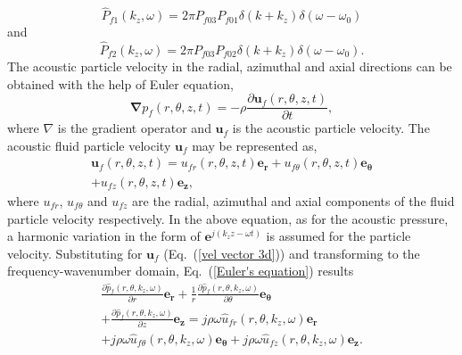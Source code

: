 \documentclass[twocolumn,10pt]{asme2ej}
\begin{document}
\begin{equation}
    \hat{P}_{f1}(k_z,\omega) = 2\pi P_{f03}P_{f01}\delta(k+k_z)\delta(\omega-\omega_0)
\end{equation}
and
\begin{equation}
    \hat{P}_{f2}(k_z,\omega) = 2\pi P_{f03}P_{f02}\delta(k+k_z)\delta(\omega-\omega_0).
\end{equation}
The acoustic particle velocity in the radial, azimuthal and axial directions can be obtained with the help of Euler equation,
\begin{equation}\label{Euler's equation}
    \pmb{\nabla} p_{f}(r,\theta,z,t) = -\rho \frac{\partial \mathbf{u}_f(r,\theta,z,t)}{\partial t},
\end{equation}
where $\nabla$ is the gradient operator and $\mathbf{u}_f$ is the acoustic particle velocity. The acoustic fluid particle velocity $\mathbf{u}_f$ may be represented as,
\begin{multline}\label{vel vector 3d}
    \mathbf{u}_f(r,\theta,z,t) = u_{fr}(r,\theta,z,t)\mathbf{e_r} + u_{f\theta}(r,\theta,z,t)\mathbf{e}_{\pmb{\theta}}\\ + u_{fz}(r,\theta,z,t)\mathbf{e_z},
\end{multline}
where $u_{fr}$, $u_{f\theta}$ and $u_{fz}$ are the radial, azimuthal and axial components of the fluid particle velocity respectively. In the above equation, as for the acoustic pressure, a harmonic variation in the form of $\mathbf{e}^{j(k_{z}z-\omega t)}$ is assumed for the particle velocity. Substituting for $\mathbf{u}_f$ (Eq.~(\ref{vel vector 3d})) and transforming to the frequency-wavenumber domain, Eq.~(\ref{Euler's equation}) results
\begin{multline}\label{equating continuity equation}
    \frac{\partial \hat{p}_f(r,\theta,k_z,\omega)}{\partial r}\mathbf{e_r} + \frac{1}{r}\frac{\partial \hat{p}_f(r,\theta,k_z,\omega)}{\partial \theta}\mathbf{e}_{\pmb{\theta}}\\ + \frac{\partial \hat{p}_f(r,\theta,k_z,\omega)}{\partial z}\mathbf{e_z} = j\rho\omega \hat{u}_{fr}(r,\theta,k_z,\omega)\mathbf{e_r}\\ + j\rho\omega \hat{u}_{f\theta}(r,\theta,k_z,\omega) \mathbf{e}_{\pmb{\theta}} + j\rho\omega \hat{u}_{fz}(r,\theta,k_z,\omega)\mathbf{e_z}.
\end{multline}
\end{document}
